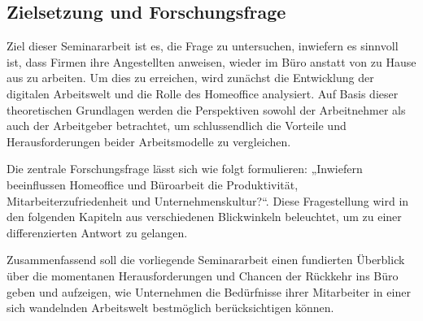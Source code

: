 \subsection{Zielsetzung und Forschungsfrage}

Ziel dieser Seminararbeit ist es, die Frage zu untersuchen, inwiefern es sinnvoll ist, dass Firmen ihre Angestellten anweisen, wieder im Büro anstatt von zu Hause aus zu arbeiten. Um dies zu erreichen, wird zunächst die Entwicklung der digitalen Arbeitswelt und die Rolle des Homeoffice analysiert. Auf Basis dieser theoretischen Grundlagen werden die Perspektiven sowohl der Arbeitnehmer als auch der Arbeitgeber betrachtet, um schlussendlich die Vorteile und Herausforderungen beider Arbeitsmodelle zu vergleichen.

Die zentrale Forschungsfrage lässt sich wie folgt formulieren: „Inwiefern beeinflussen Homeoffice und Büroarbeit die Produktivität, Mitarbeiterzufriedenheit und Unternehmenskultur?“. Diese Fragestellung wird in den folgenden Kapiteln aus verschiedenen Blickwinkeln beleuchtet, um zu einer differenzierten Antwort zu gelangen.

Zusammenfassend soll die vorliegende Seminararbeit einen fundierten Überblick über die momentanen Herausforderungen und Chancen der Rückkehr ins Büro geben und aufzeigen, wie Unternehmen die Bedürfnisse ihrer Mitarbeiter in einer sich wandelnden Arbeitswelt bestmöglich berücksichtigen können.